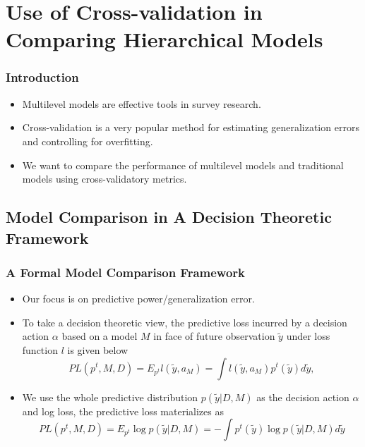 \documentclass[xetex,mathserif,serif]{beamer}
\begin{document}
\section[Cross-validation]{Use of Cross-validation in Comparing Hierarchical Models}
\begin{frame}
  \frametitle{Introduction}
  \begin{itemize}
  \item Multilevel models are effective tools in survey research.
  \item Cross-validation is a very popular method for estimating generalization
    errors and controlling for overfitting.
    \pause
  \item We want to compare the performance of multilevel models and traditional
    models using cross-validatory metrics.
  \end{itemize}
\end{frame}

\subsection{Model Comparison in A Decision Theoretic Framework}
\begin{frame}
  \frametitle{A Formal Model Comparison Framework}
  \begin{itemize}
  \item Our focus is on predictive power/generalization error.
  \item To take a decision theoretic view, the predictive loss incurred by a
    decision action $\alpha$ based on a model $M$ in face of future observation
    $\tilde y$ under loss function $l$ is given below
    \begin{equation*}
      PL(p^t, M, D)=E_{p^t}l(\tilde y, a_M)=\int l(\tilde y, a_M) p^t(\tilde y)d\tilde y,
    \end{equation*}
  \item We use the whole predictive distribution $p(\tilde y|D,M)$ as the
    decision action $\alpha$ and log loss, the predictive loss materializes as
    \begin{equation*}
      PL(p^t, M, D)=E_{p^t}\log p(\tilde y|D, M)=-\int p^t(\tilde y) \log p(\tilde y|D, M) d\tilde y
    \end{equation*}
  \end{itemize}
\end{frame}
\end{document}
